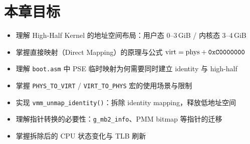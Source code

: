 \section{本章目标}

\begin{itemize}
  \item 理解 High-Half Kernel 的地址空间布局：用户态 0--3\,GiB / 内核态 3--4\,GiB
  \item 掌握直接映射（Direct Mapping）的原理与公式 $\text{virt} = \text{phys} + \texttt{0xC0000000}$
  \item 理解 \texttt{boot.asm} 中 PSE 临时映射为何需要同时建立 identity 与 high-half
  \item 掌握 \texttt{PHYS\_TO\_VIRT} / \texttt{VIRT\_TO\_PHYS} 宏的使用场景与限制
  \item 实现 \texttt{vmm\_unmap\_identity()}：拆除 identity mapping，释放低地址空间
  \item 理解指针转换的必要性：\texttt{g\_mb2\_info}、PMM bitmap 等指针的迁移
  \item 掌握拆除后的 CPU 状态变化与 TLB 刷新
\end{itemize}


